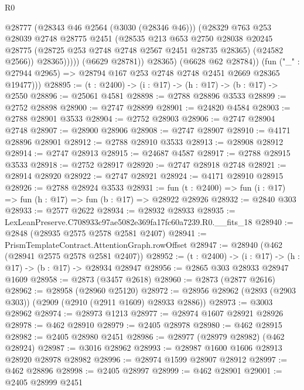 \begin{lexlean}{R0}
\begin{coremodule}
                      @28777
                      (@28343 @46 @2564 (@3030 (@28346 @46)))
                      (@28329
                        @763
                        @253
                        @28039
                        @2748
                        @28775
                        @2451
                        (@28535
                          @213
                          @653
                          @2750
                          @28038
                          @20245
                          @28775
                          (@28725 @253 @2748 @2748 @2567 @2451 @28735 @28365)
                          (@24582 @2566))
                        @28365)))))
              (@6629 @28781))
            @28365)
          (@6628 @62 @28784))
        (fun ("_" : @27944 @2965) => @28794 @167 @253 @2748 @2748 @2451 @2669 @28365 @19477)))
@28895 := (t : @2400) -> (i : @17) -> (h : @17) -> (b : @17) -> @2550
@28896 := @25061 @4581
@28898 := @2788 @28896 @3533
@28899 := @2752 @28898
@28900 := @2747 @28899
@28901 := @24820 @4584
@28903 := @2788 @28901 @3533
@28904 := @2752 @28903
@28906 := @2747 @28904 @2748
@28907 := @28900 @28906
@28908 := @2747 @28907
@28910 := @4171 @28896 @28901
@28912 := @2788 @28910 @3533
@28913 := @28908 @28912
@28914 := @2747 @28913
@28915 := @24687 @4587
@28917 := @2788 @28915 @3533
@28918 := @2752 @28917
@28920 := @2747 @28918 @2748
@28921 := @28914 @28920
@28922 := @2747 @28921
@28924 := @4171 @28910 @28915
@28926 := @2788 @28924 @3533
@28931 := fun (t : @2400) => fun (i : @17) => fun (h : @17) => fun (b : @17) => @28922 @28926
@28932 := @2840 @303
@28933 := @2577 @2622
@28934 := @28932 @28933
@28935 := LexLeanPreserve.C708933c97ae5082e369fa17fc60a7239.R0.__fits_18
@28940 := @2848 (@28935 @2575 @2578 @2581 @2407)
@28941 := PrismTemplateContract.AttentionGraph.rowOffset
@28947 := @28940 (@462 (@28941 @2575 @2578 @2581 @2407))
@28952 := (t : @2400) -> (i : @17) -> (h : @17) -> (b : @17) -> @28934 @28947
@28956 := @2865 @303 @28933 @28947 @1609
@28958 := @2873 (@3457 @2618)
@28960 := @2873 (@2877 @2616)
@28962 := @28958 (@28960 @25120)
@28972 := @28956 @28962 (@2893 (@2903 @303)) (@2909 (@2910 (@2911 @1609) @28933 @2886))
@28973 := @3003 @28962
@28974 := @28973 @1213
@28977 := @28974 @1607 @28921 @28926
@28978 := @462 @28910
@28979 := @2405 @28978
@28980 := @462 @28915
@28982 := @2405 @28980 @2451
@28986 := @28977 (@28979 @28982) (@462 @28924)
@28987 := @3016 @28962
@28993 := @28987 @1600 @1606 @28913 @28920 @28978 @28982
@28996 := @28974 @1599 @28907 @28912
@28997 := @462 @28896
@28998 := @2405 @28997
@28999 := @462 @28901
@29001 := @2405 @28999 @2451

\end{coremodule}
\end{lexlean}
